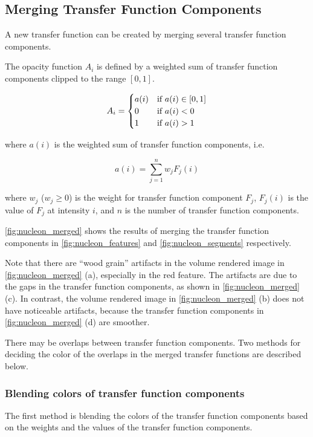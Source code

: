 \documentclass[twoside,twocolumn,10pt]{article}
\begin{document}
\subsection{Merging Transfer Function Components}
A new transfer function can be created by merging several transfer function components.

The opacity function $ A_{i} $ is defined by a weighted sum of transfer function components clipped to the range $ [0,1] $.

\[
A_{i} =
\begin{cases}
a(i) & \text{if $ a(i) \in [0,1] $} \\
0 & \text{if $ a(i)<0 $} \\
1 & \text{if $ a(i)>1 $}
\end{cases}
\]

where $ a(i) $ is the weighted sum of transfer function components, i.e.

\[ 
a(i)=\sum_{j=1}^{n} w_{j}F_{j}(i)
\]

where $ w_{j} $ ($ w_{j} \geq 0 $) is the weight for transfer function component $ F_{j} $, $ F_{j}(i) $ is the value of $ F_{j} $ at intensity $ i $, and $ n $ is the number of transfer function components.

\autoref{fig:nucleon_merged} shows the results of merging the transfer function components in \autoref{fig:nucleon_features} and \autoref{fig:nucleon_segments} respectively.

Note that there are ``wood grain'' artifacts in the volume rendered image in \autoref{fig:nucleon_merged} (a), especially in the red feature. The artifacts are due to the gaps in the transfer function components, as shown in \autoref{fig:nucleon_merged} (c).
In contrast, the volume rendered image in \autoref{fig:nucleon_merged} (b) does not have noticeable artifacts, because the transfer function components in \autoref{fig:nucleon_merged} (d) are smoother.

There may be overlaps between transfer function components. Two methods for deciding the color of the overlaps in the merged transfer functions are described below.

\subsubsection{Blending colors of transfer function components}
The first method is blending the colors of the transfer function components based on the weights and the values of the transfer function components.
\end{document}
